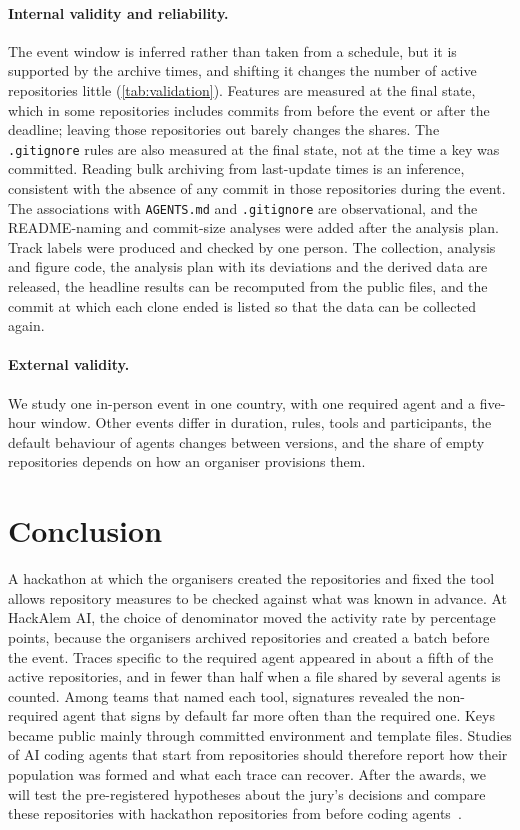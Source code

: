 \documentclass{article}
\begin{document}
\paragraph{Internal validity and reliability.} The event window is inferred rather than taken from a schedule, but it is supported by the archive times, and shifting it changes the number of active repositories little (\cref{tab:validation}). Features are measured at the final state, which in some repositories includes commits from before the event or after the deadline; leaving those repositories out barely changes the shares. The \texttt{.gitignore} rules are also measured at the final state, not at the time a key was committed. Reading bulk archiving from last-update times is an inference, consistent with the absence of any commit in those repositories during the event. The associations with \texttt{AGENTS.md} and \texttt{.gitignore} are observational, and the README-naming and commit-size analyses were added after the analysis plan. Track labels were produced and checked by one person. The collection, analysis and figure code, the analysis plan with its deviations and the derived data are released, the headline results can be recomputed from the public files, and the commit at which each clone ended is listed so that the data can be collected again.

\paragraph{External validity.} We study one in-person event in one country, with one required agent and a five-hour window. Other events differ in duration, rules, tools and participants, the default behaviour of agents changes between versions, and the share of empty repositories depends on how an organiser provisions them.

\section{Conclusion}\label{sec:conclusion}

A hackathon at which the organisers created the repositories and fixed the tool allows repository measures to be checked against what was known in advance. At HackAlem AI, the choice of denominator moved the activity rate by \NRqOneActiveGapPp{} percentage points, because the organisers archived repositories and created a batch before the event. Traces specific to the required agent appeared in about a fifth of the active repositories, and in fewer than half when a file shared by several agents is counted. Among teams that named each tool, signatures revealed the non-required agent that signs by default far more often than the required one. Keys became public mainly through committed environment and template files. Studies of AI coding agents that start from repositories should therefore report how their population was formed and what each trace can recover. After the awards, we will test the pre-registered hypotheses about the jury's decisions and compare these repositories with hackathon repositories from before coding agents~\cite{halmans2026hackrep}.
\end{document}

